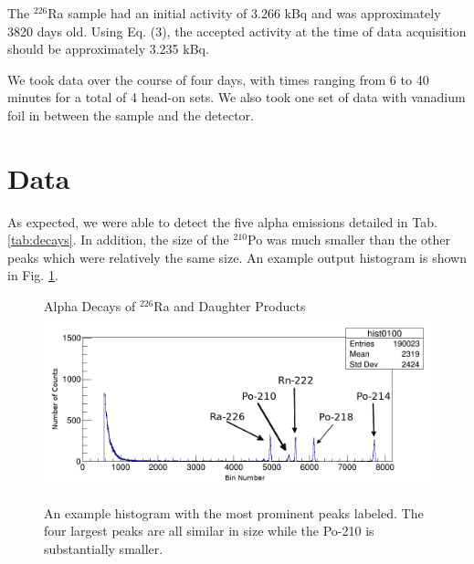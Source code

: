 \documentclass[10pt]{IEEEtran}
\begin{document}
The $^{226}$Ra sample had an initial activity of 3.266 kBq and was approximately 3820 days old. Using Eq. (3), the accepted activity at the time of data acquisition should be approximately 3.235 kBq.

We took data over the course of four days, with times ranging from 6 to 40 minutes for a total of 4 head-on sets. We also took one set of data with vanadium foil in between the sample and the detector.
\section{Data}

As expected, we were able to detect the five alpha emissions detailed in Tab. \ref{tab:decays}. In addition, the size of the $^{210}$Po was much smaller than the other peaks which were relatively the same size. An example output histogram is shown in Fig. \ref{fig:hist}.
    \begin{figure}[!h]
        \begin{center}
        Alpha Decays of $^{226}$Ra and Daughter Products
        \includegraphics[width=\columnwidth]{hist0100.png}
       \caption{An example histogram with the most prominent peaks labeled. The four largest peaks are all similar in size while the Po-210 is substantially smaller.}
        \label{fig:hist}
        \end{center}
    \end{figure}
    
\end{document}
